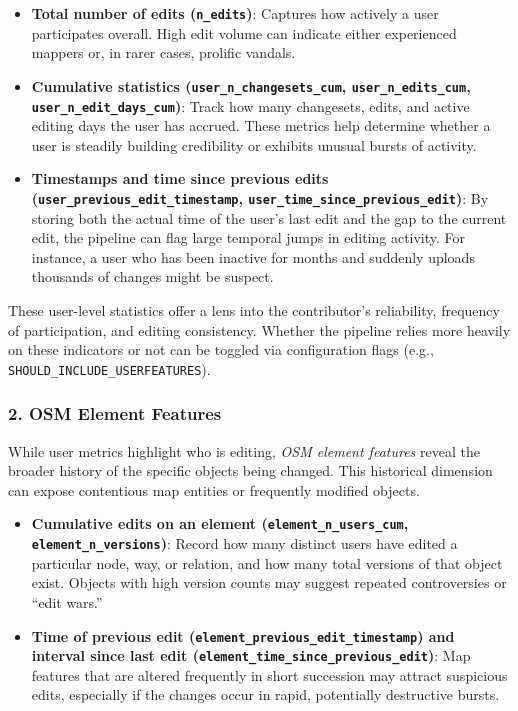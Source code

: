 \documentclass[
    13pt, %
    a4paper, %
    twoside, 
    DIV14, %
    listof=totoc, %
    bibliography=totoc, %
    index=totoc, %
    headsepline
]{scrreprt}
\begin{document}
\begin{itemize}
  \item \textbf{Total number of edits (\texttt{n\_edits})}: Captures how actively a user participates overall. High edit volume can indicate either experienced mappers or, in rarer cases, prolific vandals.
  \item \textbf{Cumulative statistics (\texttt{user\_n\_changesets\_cum}, \texttt{user\_n\_edits\_cum}, \texttt{user\_n\_edit\_days\_cum})}: Track how many changesets, edits, and active editing days the user has accrued. These metrics help determine whether a user is steadily building credibility or exhibits unusual bursts of activity.
  \item \textbf{Timestamps and time since previous edits (\texttt{user\_previous\_edit\_timestamp}, \texttt{user\_time\_since\_previous\_edit})}: By storing both the actual time of the user’s last edit and the gap to the current edit, the pipeline can flag large temporal jumps in editing activity. For instance, a user who has been inactive for months and suddenly uploads thousands of changes might be suspect.
\end{itemize}

These user-level statistics offer a lens into the contributor’s reliability, frequency of participation, and editing consistency. Whether the pipeline relies more heavily on these indicators or not can be toggled via configuration flags (e.g., \texttt{SHOULD\_INCLUDE\_USERFEATURES}).

\subsubsection*{2. OSM Element Features}
While user metrics highlight who is editing, \emph{OSM element features} reveal the broader history of the specific objects being changed. This historical dimension can expose contentious map entities or frequently modified objects.

\begin{itemize}
  \item \textbf{Cumulative edits on an element (\texttt{element\_n\_users\_cum}, \texttt{element\_n\_versions})}: Record how many distinct users have edited a particular node, way, or relation, and how many total versions of that object exist. Objects with high version counts may suggest repeated controversies or “edit wars.”
  \item \textbf{Time of previous edit (\texttt{element\_previous\_edit\_timestamp}) and interval since last edit (\texttt{element\_time\_since\_previous\_edit})}: Map features that are altered frequently in short succession may attract suspicious edits, especially if the changes occur in rapid, potentially destructive bursts.
\end{itemize}
\end{document}
